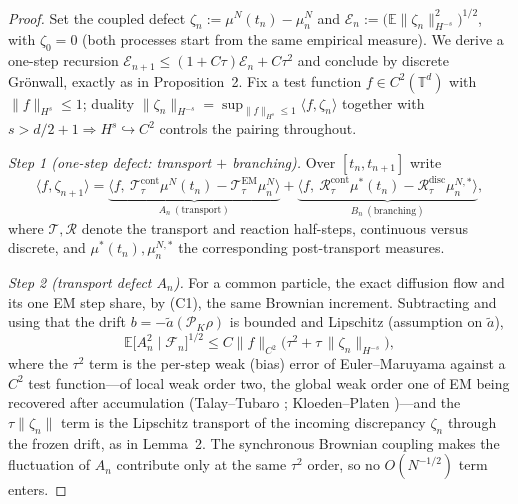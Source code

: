 \documentclass[12pt]{article}
\begin{document}
\begin{proof}
Set the coupled defect $\zeta_n:=\mu^N(t_n)-\mu^N_n$ and
$\mathcal E_n:=\big(\mathbb E\|\zeta_n\|_{H^{-s}}^2\big)^{1/2}$, with
$\zeta_0=0$ (both processes start from the same empirical measure). We derive a
one-step recursion $\mathcal E_{n+1}\le(1+C\tau)\mathcal E_n+C\tau^2$ and conclude
by discrete Gr\"onwall, exactly as in Proposition~2. Fix a test function
$f\in C^2(\mathbb T^d)$ with $\|f\|_{H^s}\le1$; duality
$\|\zeta_n\|_{H^{-s}}=\sup_{\|f\|_{H^s}\le1}\langle f,\zeta_n\rangle$ together
with $s>d/2+1\Rightarrow H^s\hookrightarrow C^2$ controls the pairing throughout.

\smallskip
\noindent\emph{Step 1 (one-step defect: transport $+$ branching).}
Over $[t_n,t_{n+1}]$ write
\[
\langle f,\zeta_{n+1}\rangle
=\underbrace{\langle f,\ \mathcal T^{\mathrm{cont}}_\tau\mu^N(t_n)
-\mathcal T^{\mathrm{EM}}_\tau\mu^N_n\rangle}_{A_n\ (\text{transport})}
+\underbrace{\langle f,\ \mathcal R^{\mathrm{cont}}_\tau\mu^{*}(t_n)
-\mathcal R^{\mathrm{disc}}_\tau\mu^{N,*}_n\rangle}_{B_n\ (\text{branching})},
\]
where $\mathcal T,\mathcal R$ denote the transport and reaction half-steps,
continuous versus discrete, and $\mu^{*}(t_n),\mu^{N,*}_n$ the corresponding
post-transport measures.

\smallskip
\noindent\emph{Step 2 (transport defect $A_n$).}
For a common particle, the exact diffusion flow and its one EM step share, by
(C1), the same Brownian increment. Subtracting and using that the drift
$b=-\tilde a(\mathcal P_K\rho)$ is bounded and Lipschitz (assumption on
$\tilde a$),
\[
\mathbb E\big[A_n^2\mid\mathcal F_n\big]^{1/2}
\le C\|f\|_{C^2}\Big(\tau^2+\tau\,\|\zeta_n\|_{H^{-s}}\Big),
\]
where the $\tau^2$ term is the per-step weak (bias) error of Euler--Maruyama
against a $C^2$ test function---of local weak order two, the global weak order
one of EM being recovered after accumulation (Talay--Tubaro
\cite{TalayTubaro}; Kloeden--Platen \cite{KloedenPlaten})---and the
$\tau\|\zeta_n\|$ term is the Lipschitz transport of the incoming discrepancy
$\zeta_n$ through the frozen drift, as in Lemma~2. The synchronous Brownian
coupling makes the fluctuation of $A_n$ contribute only at the same $\tau^2$
order, so no $O(N^{-1/2})$ term enters.


\end{proof}
\end{document}
